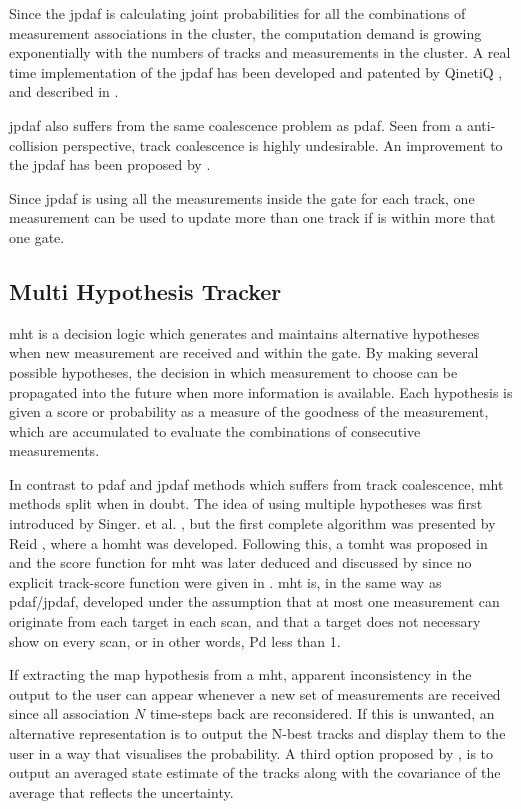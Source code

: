 Since the \gls{jpdaf} is calculating joint probabilities for all the combinations of \gls{measurement} associations in the cluster, the computation demand is growing exponentially with the numbers of tracks and \glspl{measurement} in the cluster. A real time implementation of the \gls{jpdaf} has been developed and patented by QinetiQ \cite{QinetiQ2003}, and described in \cite{Horridge}.

\gls{jpdaf} also suffers from the same coalescence problem as \gls{pdaf}. Seen from a anti-collision perspective, track coalescence is highly undesirable. An improvement to the \gls{jpdaf} has been proposed by \cite{Blom2000}.

Since \gls{jpdaf} is using all the \glspl{measurement} inside the gate for each track, one \gls{measurement} can be used to update more than one track if is within more that one gate.

\subsection{Multi Hypothesis Tracker}
\label{sec:mht}
\gls{mht} is a decision logic which generates and maintains alternative hypotheses when new \gls{measurement} are received and within the gate. By making several possible hypotheses, the decision in which \gls{measurement} to choose can be propagated into the future when more information is available. Each hypothesis is given a \gls{score} or probability as a measure of the goodness of the \gls{measurement}, which are accumulated to evaluate the combinations of consecutive \glspl{measurement}.

In contrast to \gls{pdaf} and \gls{jpdaf} methods which suffers from track coalescence, \gls{mht} methods split when in doubt. The idea of using multiple hypotheses was first introduced by Singer. et al. \cite{Singer1974}, but the first complete algorithm was presented by Reid \cite{Reid1979}, where a \gls{homht} was developed. Following this, a \gls{tomht} was proposed in \cite{Kurien1990} and the \gls{score} function for \gls{mht} was later deduced and discussed by \cite{Bar-Shalom2007} since no explicit track-score function were given in \cite{Kurien1990}. \gls{mht} is, in the same way as \gls{pdaf}/\gls{jpdaf}, developed under the assumption that at most one \gls{measurement} can originate from each \gls{target} in each scan, and that a \gls{target} does not necessary show on every scan, or in other words, \gls{Pd} less than 1.

If extracting the \gls{map} hypothesis from a \gls{mht}, apparent inconsistency in the output to the user can appear whenever a new set of \glspl{measurement} are received since all association $N$ time-steps back are reconsidered. If this is unwanted, an alternative representation is to output the N-best tracks and display them to the user in a way that visualises the probability. A third option proposed by \cite{Blackman2004}, is to output an averaged state estimate of the tracks along with the covariance of the average that reflects the uncertainty.

